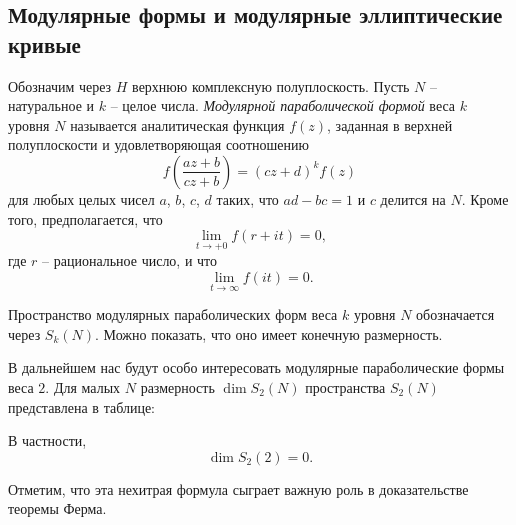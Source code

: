 \begin{multicols}{3}
\subsection*{Модулярные формы и модулярные эллиптические кривые}

Обозначим через $H$ верхнюю комплексную полуплоскость. Пусть $N$ -- натуральное и $k$ -- целое числа. \emph{Модулярной параболической формой} веса $k$ уровня $N$ называется аналитическая функция $f(z)$, заданная в верхней полуплоскости и удовлетворяющая соотношению
\begin{equation}
    \tag{5}
    \label{eq:cond}
    f\left(\frac{az + b}{cz + b}\right) = (cz + d)^kf(z)
\end{equation}
для любых целых чисел $a$, $b$, $c$, $d$ таких, что $ad - bc = 1$ и $c$ делится на $N$. Кроме того, предполагается, что
\begin{equation*}
    \lim_{t\to+0} f(r + it) = 0,
\end{equation*}
где $r$ -- рациональное число, и что
\begin{equation*}
    \lim_{t\to\infty
    } f(it) = 0.
\end{equation*}

Пространство модулярных параболических форм веса $k$ уровня $N$ обозначается через $S_k(N)$. Можно показать, что оно имеет конечную размерность.

В дальнейшем нас будут особо интересовать модулярные параболические формы веса $2$. Для малых $N$ размерность $\dim S_2(N)$ пространства $S_2(N)$ представлена в таблице:
\begin{center}
\renewcommand{\arraystretch}{2}
\renewcommand{\arraystretch}{1}
\end{center}
В частности,
\begin{equation}
    \tag{6}
    \dim S_2(2) = 0.
\end{equation}

Отметим, что эта нехитрая формула сыграет важную роль в доказательстве теоремы Ферма.


\end{multicols}
